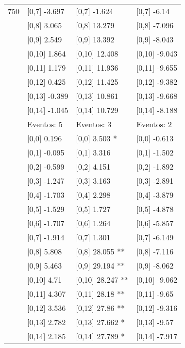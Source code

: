 \begin{table}
\begin{tabular}[t]{llll}
750 & {}[0,7] -3.697 & {}[0,7] -1.624 & {}[0,7] -6.14\\
\addlinespace
 & {}[0,8] 3.065 & {}[0,8] 13.279 & {}[0,8] -7.096\\
 & {}[0,9] 2.549 & {}[0,9] 13.392 & {}[0,9] -8.043\\
 & {}[0,10] 1.864 & {}[0,10] 12.408 & {}[0,10] -9.043\\
 & {}[0,11] 1.179 & {}[0,11] 11.936 & {}[0,11] -9.655\\
 & {}[0,12] 0.425 & {}[0,12] 11.425 & {}[0,12] -9.382\\
\addlinespace
 & {}[0,13] -0.389 & {}[0,13] 10.861 & {}[0,13] -9.668\\
 & {}[0,14] -1.045 & {}[0,14] 10.729 & {}[0,14] -8.188\\
 & Eventos:  5 & Eventos:  3 & Eventos:  2\\
 & {}[0,0] 0.196 & {}[0,0] 3.503 * & {}[0,0] -0.613\\
 & {}[0,1] -0.095 & {}[0,1] 3.316 & {}[0,1] -1.502\\
\addlinespace
 & {}[0,2] -0.599 & {}[0,2] 4.151 & {}[0,2] -1.892\\
 & {}[0,3] -1.247 & {}[0,3] 3.163 & {}[0,3] -2.891\\
 & {}[0,4] -1.703 & {}[0,4] 2.298 & {}[0,4] -3.879\\
 & {}[0,5] -1.529 & {}[0,5] 1.727 & {}[0,5] -4.878\\
 & {}[0,6] -1.707 & {}[0,6] 1.264 & {}[0,6] -5.857\\
\addlinespace
1000 & {}[0,7] -1.914 & {}[0,7] 1.301 & {}[0,7] -6.149\\
 & {}[0,8] 5.808 & {}[0,8] 28.055 ** & {}[0,8] -7.116\\
 & {}[0,9] 5.463 & {}[0,9] 29.194 ** & {}[0,9] -8.062\\
 & {}[0,10] 4.71 & {}[0,10] 28.247 ** & {}[0,10] -9.062\\
 & {}[0,11] 4.307 & {}[0,11] 28.18 ** & {}[0,11] -9.65\\
\addlinespace
 & {}[0,12] 3.536 & {}[0,12] 27.86 ** & {}[0,12] -9.316\\
 & {}[0,13] 2.782 & {}[0,13] 27.662 * & {}[0,13] -9.57\\
 & {}[0,14] 2.185 & {}[0,14] 27.789 * & {}[0,14] -7.917\\
\bottomrule
\end{tabular}
\end{table}
